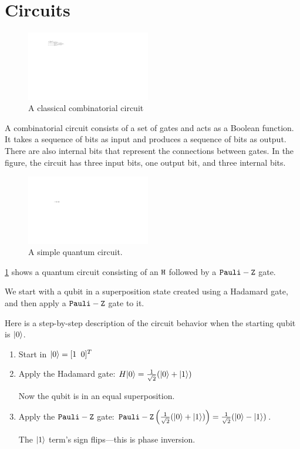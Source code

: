\section{Circuits} 


\begin{figure}
\includegraphics[width=0.48\textwidth]{Figures/HWCircuits/DigitalCircuit} 
\caption{A classical combinatorial circuit}
\end{figure}
A combinatorial circuit consists of a set of gates and acts as a Boolean function. It takes a sequence of bits as input and produces a sequence of bits as output. There are also internal bits that represent the connections between gates. In the figure, the circuit has three input bits, one output bit, and three internal bits.


\begin{figure}
\includegraphics[width=0.48\textwidth]{Figures/Circuits/HZ} 
\caption{A simple quantum circuit.}
\label{HZ:fig}
\end{figure}

\cref{HZ:fig} shows a quantum circuit consisting of an $\mathtt{H}$ followed by a $\mathtt{Pauli-Z}$ gate.


We start with a qubit in a superposition state created using a Hadamard gate, and then apply a $\mathtt{Pauli-Z}$ gate to it.

Here is a step-by-step description of the circuit behavior when the starting qubit is $|0\rangle$.

\begin{enumerate}
\item Start in $|0\rangle = [1 \;\; 0]^T$
\item Apply the Hadamard gate: 
$H|0\rangle = \frac{1}{\sqrt{2}}(|0\rangle + |1\rangle)$

Now the qubit is in an equal superposition.
\item Apply the $\mathtt{Pauli-Z}$ gate: 
$\mathtt{Pauli-Z}\left(\frac{1}{\sqrt{2}}(|0\rangle + |1\rangle)\right) = \frac{1}{\sqrt{2}}(|0\rangle - |1\rangle)$.

The $|1\rangle$ term’s sign flips—this is phase inversion.
\end{enumerate}

